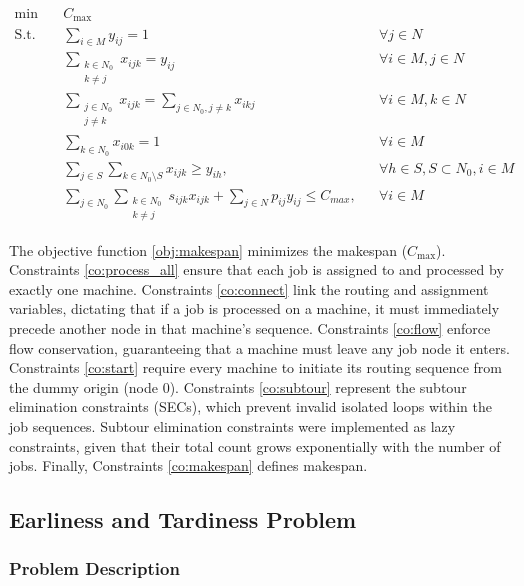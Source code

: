 \documentclass{article}
\begin{document}
\begin{align}
    \min \quad & C_{\max} \label{obj:makespan} \\
    \text{S.t.} \quad & \sum_{i \in M} y_{ij} = 1 && \forall j \in N \label{co:process_all} \\
    & \sum_{\substack{k \in N_0\\k \neq j}} x_{ijk} = y_{ij} && \forall i \in M, j \in N \label{co:connect} \\
    & \sum_{\substack{j \in N_0\\j \neq k}} x_{ijk} = \sum_{j \in N_0, j \neq k} x_{ikj} && \forall i \in M, k \in N \label{co:flow} \\
    & \sum_{k \in N_0} x_{i0k} = 1 && \forall i \in M \label{co:start} \\
    & \sum_{j \in S} \sum_{k \in N_0 \setminus S} x_{ijk} \geq y_{ih}, && \forall h \in S, S \subset N_0, i \in M \label{co:subtour} \\
    & \sum_{j \in N_0} \sum_{\substack{k \in N_0\\k \neq j}} s_{ijk} x_{ijk} + \sum_{j \in N} p_{ij} y_{ij} \leq C_{max}, && \forall i \in M \label{co:makespan}
\end{align}

The objective function \eqref{obj:makespan} minimizes the makespan ($C_{\max}$). 
Constraints \eqref{co:process_all} ensure that each job is assigned to and processed by exactly one machine. 
Constraints \eqref{co:connect} link the routing and assignment variables, dictating that if a job is processed on a machine, it must immediately precede another node in that machine's sequence. 
Constraints \eqref{co:flow} enforce flow conservation, guaranteeing that a machine must leave any job node it enters. 
Constraints \eqref{co:start} require every machine to initiate its routing sequence from the dummy origin (node 0). 
Constraints \eqref{co:subtour} represent the subtour elimination constraints (SECs), which prevent invalid isolated loops within the job sequences. 
Subtour elimination constraints were implemented as lazy constraints, given that their total count grows exponentially with the number of jobs.
Finally, Constraints \eqref{co:makespan} defines makespan.

\subsection{Earliness and Tardiness Problem}

\subsubsection{Problem Description}
\end{document}
